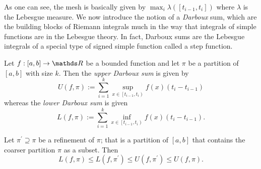 As one can see, the mesh is basically given by $\max_{i}\lambda\left(\left[t_{i-1},t_{i}\right]\right)$
where $\lambda$ is the Lebesgue measure. We now introduce the notion
of a \emph{Darboux }sum, which are the building blocks of Riemann
integrals much in the way that integrals of simple functions are in
the Lebesgue theory. In fact, Darboux sums are the Lebesgue integrals
of a special type of signed simple function called a step function.
\begin{defn}
\label{def:darbouxSums}Let $f:\left[a,b\right]\to\R$ be a bounded
function and let $\pi$ be a partition of $\left[a,b\right]$ with
size $k.$ Then the \emph{upper Darboux sum }is given by 
\[
U\left(f,\pi\right):=\sum_{i=1}^{k}\sup_{x\in\left[t_{i-1},t_{i}\right)}f\left(x\right)\left(t_{i}-t_{i-1}\right)
\]
whereas the \emph{lower Darboux sum }is given
\[
L\left(f,\pi\right):=\sum_{i=1}^{k}\inf_{x\in\left[t_{i-1},t_{i}\right)}f\left(x\right)\left(t_{i}-t_{i-1}\right).
\]
\end{defn}

\begin{prop}
\label{prop:darbouxSumInequality}Let $\pi^{\prime}\supseteq\pi$
be a refinement of $\pi$; that is a partition of $\left[a,b\right]$
that contains the coarser partition $\pi$ as a subset. Then
\[
L\left(f,\pi\right)\leq L\left(f,\pi^{\prime}\right)\leq U\left(f,\pi^{\prime}\right)\leq U\left(f,\pi\right).
\]
\end{prop}

